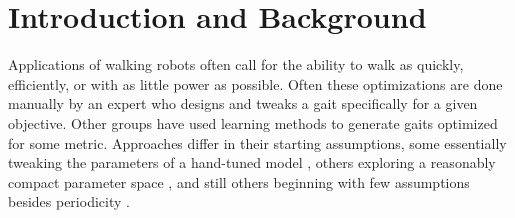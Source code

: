 \section{Introduction and Background}



Applications of walking robots often call for the ability to walk as
quickly, efficiently, or with as little power as possible.  Often
these optimizations are done manually by an expert who designs and
tweaks a gait specifically for a given objective.  Other groups have
used learning methods to generate gaits optimized for some metric.
Approaches differ in their starting assumptions, some essentially
tweaking the parameters of a hand-tuned model \cite{chernova}, others
exploring a reasonably compact parameter space \cite{kohl}, and still
others beginning with few assumptions besides periodicity
\cite{zykov}.












